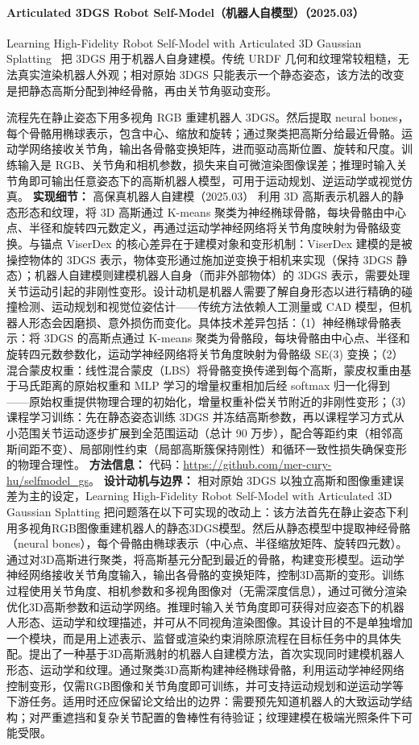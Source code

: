 \paragraph{Articulated 3DGS Robot Self-Model（机器人自模型）（2025.03）}
Learning High-Fidelity Robot Self-Model with Articulated 3D Gaussian Splatting~\cite{2503_05398} 把 3DGS 用于机器人自身建模。传统 URDF 几何和纹理常较粗糙，无法真实渲染机器人外观；相对原始 3DGS 只能表示一个静态姿态，该方法的改变是把静态高斯分配到神经骨骼，再由关节角驱动变形。

流程先在静止姿态下用多视角 RGB 重建机器人 3DGS。然后提取 neural bones，每个骨骼用椭球表示，包含中心、缩放和旋转；通过聚类把高斯分给最近骨骼。运动学网络接收关节角，输出各骨骼变换矩阵，进而驱动高斯位置、旋转和尺度。训练输入是 RGB、关节角和相机参数，损失来自可微渲染图像误差；推理时输入关节角即可输出任意姿态下的高斯机器人模型，可用于运动规划、逆运动学或视觉仿真。
\textbf{实现细节：} 高保真机器人自建模（2025.03） 利用 3D 高斯表示机器人的静态形态和纹理，将 3D 高斯通过 K-means 聚类为神经椭球骨骼，每块骨骼由中心点、半径和旋转四元数定义，再通过运动学神经网络将关节角度映射为骨骼级变换。与锚点 ViserDex 的核心差异在于建模对象和变形机制：ViserDex 建模的是被操控物体的 3DGS 表示，物体变形通过施加逆变换于相机来实现（保持 3DGS 静态）；机器人自建模则建模机器人自身（而非外部物体）的 3DGS 表示，需要处理关节运动引起的非刚性变形。设计动机是机器人需要了解自身形态以进行精确的碰撞检测、运动规划和视觉位姿估计——传统方法依赖人工测量或 CAD 模型，但机器人形态会因磨损、意外损伤而变化。具体技术差异包括：（1）神经椭球骨骼表示：将 3DGS 的高斯点通过 K-means 聚类为骨骼段，每块骨骼由中心点、半径和旋转四元数参数化，运动学神经网络将关节角度映射为骨骼级 SE(3) 变换；（2）混合蒙皮权重：线性混合蒙皮（LBS）将骨骼变换传递到每个高斯，蒙皮权重由基于马氏距离的原始权重和 MLP 学习的增量权重相加后经 softmax 归一化得到——原始权重提供物理合理的初始化，增量权重补偿关节附近的非刚性变形；（3）课程学习训练：先在静态姿态训练 3DGS 并冻结高斯参数，再以课程学习方式从小范围关节运动逐步扩展到全范围运动（总计 90 万步），配合等距约束（相邻高斯间距不变）、局部刚性约束（局部高斯簇保持刚性）和循环一致性损失确保变形的物理合理性。
\textbf{方法信息：} 代码：\url{https://github.com/mer-cury-hu/selfmodel_gs}。
\textbf{设计动机与边界：} 相对原始 3DGS 以独立高斯和图像重建误差为主的设定，Learning High-Fidelity Robot Self-Model with Articulated 3D Gaussian Splatting 把问题落在以下可实现的改动上：该方法首先在静止姿态下利用多视角RGB图像重建机器人的静态3DGS模型。然后从静态模型中提取神经骨骼（neural bones），每个骨骼由椭球表示（中心点、半径缩放矩阵、旋转四元数）。通过对3D高斯进行聚类，将高斯基元分配到最近的骨骼，构建变形模型。运动学神经网络接收关节角度输入，输出各骨骼的变换矩阵，控制3D高斯的变形。训练过程使用关节角度、相机参数和多视角图像对（无需深度信息），通过可微分渲染优化3D高斯参数和运动学网络。推理时输入关节角度即可获得对应姿态下的机器人形态、运动学和纹理描述，并可从不同视角渲染图像。其设计目的不是单独增加一个模块，而是用上述表示、监督或渲染约束消除原流程在目标任务中的具体失配。提出了一种基于3D高斯溅射的机器人自建模方法，首次实现同时建模机器人形态、运动学和纹理。通过聚类3D高斯构建神经椭球骨骼，利用运动学神经网络控制变形，仅需RGB图像和关节角度即可训练，并可支持运动规划和逆运动学等下游任务。适用时还应保留论文给出的边界：需要预先知道机器人的大致运动学结构；对严重遮挡和复杂关节配置的鲁棒性有待验证；纹理建模在极端光照条件下可能受限。
